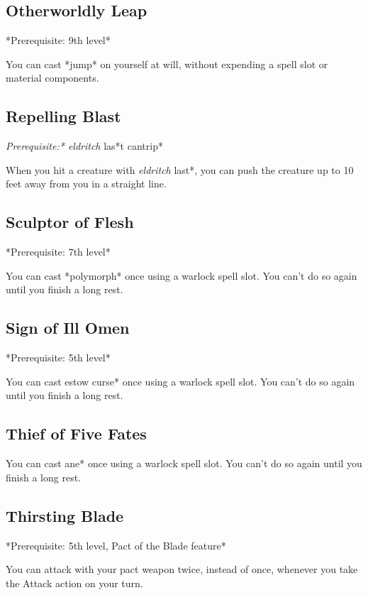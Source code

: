 \subsection{Otherworldly Leap}

*Prerequisite: 9th level*

You can cast *jump* on yourself at will, without expending a spell slot or material components.

\subsection{Repelling Blast}

\textit{Prerequisite:* eldritch }las*t cantrip*

When you hit a creature with \textit{eldritch }last*, you can push the creature up to 10 feet away from you in a straight line.

\subsection{Sculptor of Flesh}

*Prerequisite: 7th level*

You can cast *polymorph* once using a warlock spell slot. You can’t do so again until you finish a long rest.

\subsection{Sign of Ill Omen}

*Prerequisite: 5th level*

You can cast \textit{}estow curse* once using a warlock spell slot. You can’t do so again until you finish a long rest.

\subsection{Thief of Five Fates}

You can cast \textit{}ane* once using a warlock spell slot. You can’t do so again until you finish a long rest.

\subsection{Thirsting Blade}

*Prerequisite: 5th level, Pact of the Blade feature*

You can attack with your pact weapon twice, instead of once, whenever you take the Attack action on your turn.

